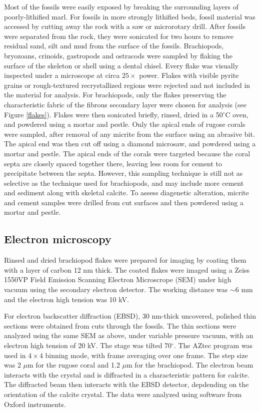 \documentclass{article}
\newcommand{\degrees}{$^{\circ}$}
\begin{document}
Most of the fossils were easily exposed by breaking the surrounding layers of poorly-lithified marl. For fossils in more strongly lithified beds, fossil material was accessed by cutting away the rock with a saw or microrotary drill. After fossils were separated from the rock, they were sonicated for two hours to remove residual sand, silt and mud from the surface of the fossils. Brachiopods, bryozoans, crinoids, gastropods and ostracods were sampled by flaking the surface of the skeleton or shell using a dental chisel. Every flake was visually inspected under a microscope at circa $25\times$ power. Flakes with visible pyrite grains or rough-textured recrystallized regions were rejected and not included in the material for analysis. For brachiopods, only the flakes preserving the characteristic fabric of the fibrous secondary layer were chosen for analysis (see Figure \ref{flakes}). Flakes were then sonicated briefly, rinsed, dried in a 50\degrees C oven, and powdered using a mortar and pestle. Only the apical ends of rugose corals were sampled, after removal of any micrite from the surface using an abrasive bit. The apical end was then cut off using a diamond microsaw, and powdered using a mortar and pestle. The apical ends of the corals were targeted because the coral septa are closely spaced together there, leaving less room for cement to precipitate between the septa. However, this sampling technique is still not as selective as the technique used for brachiopods, and may include more cement and sediment along with skeletal calcite. To assess diagenetic alteration, micrite and cement samples were drilled from cut surfaces and then powdered using a mortar and pestle. 

\subsection{Electron microscopy}

Rinsed and dried brachiopod flakes were prepared for imaging by coating them with a layer of carbon 12 nm thick. The coated flakes were imaged using a Zeiss 1550VP Field Emission Scanning Electron Microscrope (SEM) under high vacuum using the secondary electron detector. The working distance was $\sim 6$ mm and the electron high tension was 10 kV. 

For electron backscatter diffraction (EBSD), 30 nm-thick uncovered, polished thin sections were obtained from cuts through the fossils. The thin sections were analyzed using the same SEM as above, under variable pressure vacuum, with an electron high tension of 20 kV. The stage was tilted 70$^{\circ}$. The AZtec program was used in $4\times4$ binning mode, with frame averaging over one frame. The step size was 2 $\mu$m for the rugose coral and 1.2 $\mu$m for the brachiopod. The electron beam interacts with the crystal and is diffracted in a characteristic pattern for calcite. The diffracted beam then interacts with the EBSD detector, depdending on the orientation of the calcite crystal. The data were analyzed using software from Oxford instruments.
\end{document}
